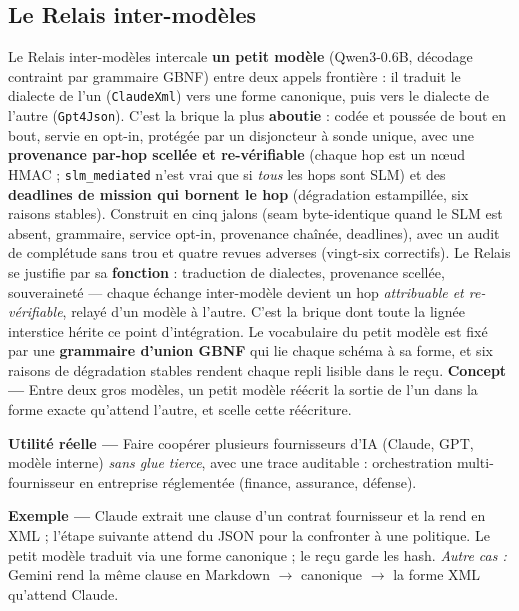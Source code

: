 \documentclass[11pt]{article}
\newcommand{\concept}[1]{{\color{efenavy}\textbf{Concept —} }#1\par}
\newcommand{\exemple}[1]{{\color{efeamber}\textbf{Exemple —} }#1\par}
\newcommand{\utilite}[1]{{\color{efeplum}\textbf{Utilité réelle —} }#1\par}
\begin{document}
\subsection{Le Relais inter-modèles}
Le Relais inter-modèles intercale \textbf{un petit modèle} (Qwen3-0.6B, décodage contraint par grammaire GBNF)
entre deux appels frontière : il traduit le dialecte de l'un (\texttt{ClaudeXml}) vers une
forme canonique, puis vers le dialecte de l'autre (\texttt{Gpt4Json}). C'est la brique la
plus \textbf{aboutie} : codée et poussée de bout en bout, servie en
opt-in, protégée par un disjoncteur à sonde unique, avec une \textbf{provenance par-hop
scellée et re-vérifiable} (chaque hop est un n\oe ud HMAC ; \texttt{slm\_mediated} n'est vrai
que si \emph{tous} les hops sont SLM) et des \textbf{deadlines de mission qui bornent le hop}
(dégradation estampillée, six raisons stables). Construit en cinq jalons (seam byte-identique
quand le SLM est absent, grammaire, service opt-in, provenance chaînée, deadlines), avec un
audit de complétude sans trou et quatre revues adverses (vingt-six correctifs).
Le Relais se justifie par sa \textbf{fonction} : traduction de dialectes, provenance scellée,
souveraineté — chaque échange inter-modèle devient un hop \emph{attribuable et re-vérifiable},
relayé d'un modèle à l'autre. C'est la brique dont toute la lignée interstice hérite ce point d'intégration.
Le vocabulaire du petit modèle est fixé par une \textbf{grammaire d'union GBNF} qui lie chaque
schéma à sa forme, et six raisons de dégradation stables rendent chaque repli lisible dans le
reçu.
\concept{Entre deux gros modèles, un petit modèle réécrit la sortie de l'un dans la forme exacte
qu'attend l'autre, et scelle cette réécriture.}
\utilite{Faire coopérer plusieurs fournisseurs d'IA (Claude, GPT, modèle interne) \emph{sans
glue tierce}, avec une trace auditable : orchestration multi-fournisseur en entreprise réglementée
(finance, assurance, défense).}
\exemple{Claude extrait une clause d'un contrat fournisseur et la rend en XML ; l'étape
suivante attend du JSON pour la confronter à une politique. Le petit modèle traduit via une
forme canonique ; le reçu garde les hash. \emph{Autre cas :} Gemini rend la même clause en
Markdown $\rightarrow$ canonique $\rightarrow$ la forme XML qu'attend Claude.}
\end{document}
